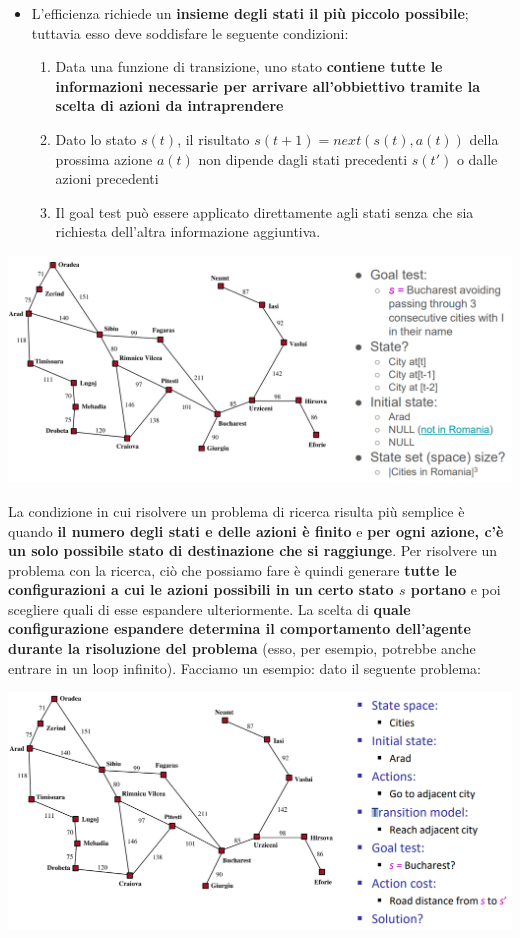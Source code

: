 \documentclass[12pt]{article}
\begin{document}
\begin{itemize}
    \item L'efficienza richiede un \textbf{insieme degli stati il più piccolo possibile}; tuttavia esso deve soddisfare le seguente condizioni:
    \begin{enumerate}
        \item Data una funzione di transizione, uno stato \textbf{contiene tutte le informazioni necessarie per arrivare all'obbiettivo tramite la scelta di azioni da intraprendere}
        \item Dato lo stato $s(t)$, il risultato $s(t+1) = next(s(t), a(t))$ della prossima azione $a(t)$ non dipende dagli stati precedenti $s(t')$ o dalle azioni precedenti
        \item Il goal test può essere applicato direttamente agli stati senza che sia richiesta dell'altra informazione aggiuntiva.
    \end{enumerate}
\end{itemize}
\begin{center}
    \includegraphics[width = 1\linewidth]{Images/20.PNG}
\end{center}
La condizione in cui risolvere un problema di ricerca risulta più semplice è quando \textbf{il numero degli stati e delle azioni è finito} e \textbf{per ogni azione, c'è un solo possibile stato di destinazione che si raggiunge}.
Per risolvere un problema con la ricerca, ciò che possiamo fare è quindi generare \textbf{tutte le configurazioni a cui le azioni possibili in un certo stato $s$ portano} e poi scegliere quali
di esse espandere ulteriormente. La scelta di \textbf{quale configurazione espandere determina il comportamento dell'agente durante la risoluzione del problema} (esso, per esempio, potrebbe anche entrare in un loop infinito).
Facciamo un esempio: dato il seguente problema:
\begin{center}
    \includegraphics[width = 1\linewidth]{Images/21.PNG}
\end{center}
\end{document}
